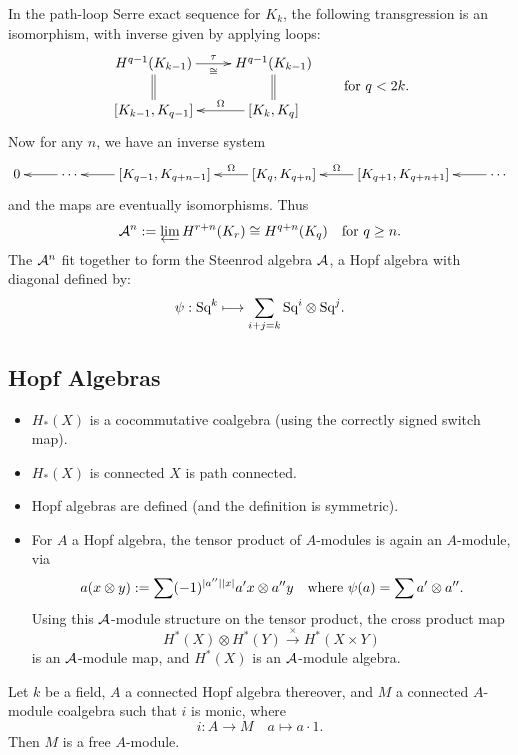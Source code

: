 \documentclass[11pt]{article}
\renewcommand{\Steen}{\calA}
\begin{document}
In the path-loop Serre exact sequence for $K_k$, the following transgression is an isomorphism, with inverse given by applying loops:
\[\vcenter{\xymatrix@R=6mm{
{H}^{q-1}(K_{k-1})
\ar[r]_-{\cong}^-{\tau}
\ar@{=}[d]
&%
{H}^{q-1}(K_{k-1})
\ar@{=}[d]
\\%
[K_{k-1},K_{q-1}]
&%
[K_{k},K_{q}]
\ar[l]_-{\Omega}
}}\textup{\qquad for $q<2k$}.\]
Now for any $n$, we have an inverse system
\[\xymatrix{
0&
\ar[l]\cdots&
[K_{q-1},K_{q+n-1}]\ar[l]&
[K_q,K_{q+n}]\ar[l]_-\Omega&
[K_{q+1},K_{q+n+1}]\ar[l]_-\Omega&
\cdots\ar[l]}\]
and the maps are eventually isomorphisms. Thus
\[\Steen^n:=\varprojlim H^{r+n}(K_r)\cong H^{q+n}(K_q)\textup{\quad for $q\geq n$.}\]
The $\Steen^n$ fit together to form the Steenrod algebra $\Steen$, a Hopf algebra with diagonal defined by:
\[\psi:\textup{Sq}^k\longmapsto\sum_{i+j=k}\textup{Sq}^i\otimes\textup{Sq}^j.\]
\subsection{Hopf Algebras}
\begin{itemize}\squishlist
\item $H_*(X)$ is a cocommutative coalgebra (using the correctly signed switch map).
\item $H_*(X)$ is connected \Iff $X$ is path connected.
\item Hopf algebras are defined (and the definition is symmetric).
\item For $A$ a Hopf algebra, the tensor product of $A$-modules is again an $A$-module, via
\[a(x\otimes y):=\sum(-1)^{|a''||x|}a'x\otimes a''y\textup{\quad where $\psi(a)=\sum a'\otimes a''$.}\]
Using this $\Steen$-module structure on the tensor product, the cross product map
\[H^*(X)\otimes H^*(Y)\overset{\times }{\to}H^*(X\times Y)\]
is an $\Steen$-module map, and $H^*(X)$ is an $\Steen$-module algebra.
\end{itemize}
\begin{prop*}
Let $k$ be a field, $A$ a connected Hopf algebra thereover, and $M$ a connected $A$-module coalgebra such that $i$ is monic, where
\[i:A\to M\quad a\mapsto a\cdot 1.\]
 Then $M$ is a free $A$-module.
\end{prop*}
\end{document}
